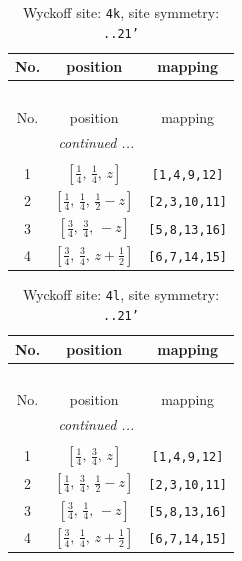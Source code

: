 \documentclass[fleqn,8pt]{jsarticle}
\begin{document}
\renewcommand{\arraystretch}{1.2}
\begin{longtable}{ccc}
\caption{Wyckoff site: {\tt 4k}, site symmetry: {\tt ..21'}}
 \\
 \hline \hline
No. & position & mapping \\ \hline \endfirsthead

\multicolumn{2}{l}{\tablename\ \thetable{}} \\
 \hline \hline
No. & position & mapping \\ \hline \endhead

 \hline \hline
\multicolumn{2}{r}{\footnotesize\it continued ...} \\ \endfoot

 \hline \hline
\multicolumn{2}{r}{} \\ \endlastfoot

1 & $\left[ \frac{1}{4},\, \frac{1}{4},\, z \right]$ & {\tt [1,4,9,12]} \\ \hline
2 & $\left[ \frac{1}{4},\, \frac{1}{4},\, \frac{1}{2} - z \right]$ & {\tt [2,3,10,11]} \\ \hline
3 & $\left[ \frac{3}{4},\, \frac{3}{4},\, - z \right]$ & {\tt [5,8,13,16]} \\ \hline
4 & $\left[ \frac{3}{4},\, \frac{3}{4},\, z + \frac{1}{2} \right]$ & {\tt [6,7,14,15]} \\
\end{longtable}
\renewcommand{\arraystretch}{1.2}
\begin{longtable}{ccc}
\caption{Wyckoff site: {\tt 4l}, site symmetry: {\tt ..21'}}
 \\
 \hline \hline
No. & position & mapping \\ \hline \endfirsthead

\multicolumn{2}{l}{\tablename\ \thetable{}} \\
 \hline \hline
No. & position & mapping \\ \hline \endhead

 \hline \hline
\multicolumn{2}{r}{\footnotesize\it continued ...} \\ \endfoot

 \hline \hline
\multicolumn{2}{r}{} \\ \endlastfoot

1 & $\left[ \frac{1}{4},\, \frac{3}{4},\, z \right]$ & {\tt [1,4,9,12]} \\ \hline
2 & $\left[ \frac{1}{4},\, \frac{3}{4},\, \frac{1}{2} - z \right]$ & {\tt [2,3,10,11]} \\ \hline
3 & $\left[ \frac{3}{4},\, \frac{1}{4},\, - z \right]$ & {\tt [5,8,13,16]} \\ \hline
4 & $\left[ \frac{3}{4},\, \frac{1}{4},\, z + \frac{1}{2} \right]$ & {\tt [6,7,14,15]} \\
\end{longtable}
\end{document}
